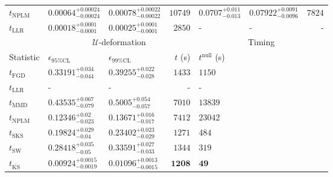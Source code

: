 \begin{tabular}{l|llr|llr}
\rowcolor{red!35}	$t_{\mathrm{NPLM}}$ & $0.00064_{-0.00024}^{+0.00024}$ & $0.00078_{-0.00022}^{+0.00022}$ & $10749$ & $0.0707_{-0.013}^{+0.011}$ & $0.07922_{-0.0096}^{+0.0091}$ & $7824$ \\
	$t_{\mathrm{LLR}}$ & $0.00018_{-0.0001}^{+0.0001}$ & $0.00025_{-0.0001}^{+0.0001}$ & $2850$ & - & - & - \\
	\toprule
	\multicolumn{1}{c}{} & \multicolumn{3}{c}{$\mathcal{U}$-deformation} & \multicolumn{3}{c}{Timing} \\
	Statistic & $\epsilon_{95\%\mathrm{CL}}$ & $\epsilon_{99\%\mathrm{CL}}$ & $t$ (s) & $t^{\mathrm{null}}$ (s) \\
	\midrule
	$t_{\mathrm{FGD}}$ & $0.33191_{-0.044}^{+0.034}$ & $0.39255_{-0.028}^{+0.022}$ & $1433$ & $1150$ \\
	$t_{\mathrm{LLR}}$ & - & - & - & - \\
	$t_{\mathrm{MMD}}$ & $0.43535_{-0.079}^{+0.067}$ & $0.5005_{-0.057}^{+0.054}$ & $7010$ & $13839$ \\
\rowcolor{red!35}	$t_{\mathrm{NPLM}}$ & $0.12346_{-0.023}^{+0.02}$ & $0.13671_{-0.017}^{+0.016}$ & $7412$ & $23042$ \\
	$t_{\mathrm{SKS}}$ & $0.19824_{-0.04}^{+0.029}$ & $0.23402_{-0.029}^{+0.023}$ & $1271$ & $484$ \\
	$t_{\mathrm{SW}}$ & $0.28418_{-0.05}^{+0.035}$ & $0.33591_{-0.033}^{+0.027}$ & $1344$ & $319$ \\
	$t_{\overline{\mathrm{KS}}}$ & ${\mathbf{0.00924_{-0.0019}^{+0.0015}}}$ & ${\mathbf{0.01096_{-0.0015}^{+0.0013}}}$ & ${\mathbf{1208}}$ & ${\mathbf{49}}$ \\
	\bottomrule
\end{tabular}